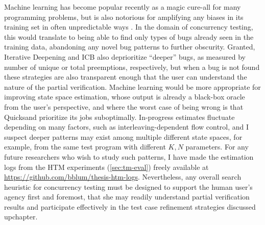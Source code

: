 Machine learning has become popular recently as a magic cure-all for many programming problems,
but is also notorious for amplifying any biases in its training set in often unpredictable ways
\cite{conceptnet-bias,amazon-ai}.
In the domain of concurrency testing, this would translate to being able to find only types of bugs
already seen in the training data, abandoning any novel bug patterns to further obscurity.
Granted,
Iterative Deepening and
ICB also deprioritize ``deeper'' bugs,
as measured by number of unique or total preemptions, respectively,
but when a bug is not found
these strategies are also transparent enough that the user can understand the nature of the partial verification.
%
Machine learning would be more appropriate for improving state space estimation,
whose output is already a black-box oracle from the user's perspective,
and where the worst case of being wrong
is that Quicksand prioritize its jobs suboptimally. %
In-progress estimates fluctuate depending on many factors,
such as interleaving-dependent flow control,
and I suspect deeper patterns may exist among multiple different state spaces,
for example,
from the same test program with different $K,N$ parameters.
For any future researchers who wish to study such patterns,
I have made the estimation logs from the HTM experiments (\cref{sec:tm-eval})
freely available at \url{https://github.com/bblum/thesis-htm-logs}.
%
Nevertheless,
any overall search heuristic for concurrency testing
must be designed to support the human user's agency first and foremost,
that she may readily understand partial verification results
and participate effectively in the test case refinement strategies discussed
upchapter. %




